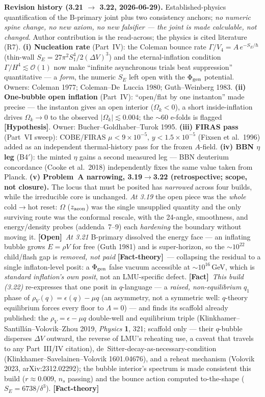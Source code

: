 \documentclass[11pt]{article}
\newcommand{\fact}{\textcolor{green!40!black}{\textbf{[Fact]}}}
\newcommand{\factth}{\textcolor{green!40!black}{\textbf{[Fact-theory]}}}
\newcommand{\hyp}{\textcolor{orange!80!black}{\textbf{[Hypothesis]}}}
\newcommand{\open}{\textcolor{red!70!black}{\textbf{[Open]}}}
\begin{document}
{\smallskip\noindent\textbf{Revision history (3.21 $\to$ 3.22, 2026-06-29).} Established-physics quantification of the B-primary joint plus two consistency anchors; \emph{no numeric spine change, no new axiom, no new falsifier --- the joint is made calculable, not changed}. Author contribution is the read-across; the physics is cited literature (R7). \textbf{(i) Nucleation rate} (Part~IV): the Coleman bounce rate $\Gamma/V_4=A\,e^{-S_E/\hbar}$ (thin-wall $S_E=27\pi^2 S_1^4/2(\Delta V)^3$) and the eternal-inflation condition $\Gamma/H^4\lesssim\mathcal{O}(1)$ now make ``infinite asynchronous trials beat suppression'' quantitative --- a \emph{form}, the numeric $S_E$ left open with the $\Phi_{\rm gen}$ potential. Owners: Coleman 1977; Coleman--De~Luccia 1980; Guth--Weinberg 1983. \textbf{(ii) One-bubble open inflation} (Part~IV): ``open/flat by one instanton'' made precise --- the instanton gives an open interior ($\Omega_k<0$), a short inside-inflation drives $\Omega_k\to0$ to the observed $|\Omega_k|\lesssim0.004$; the $\sim$60 e-folds is flagged \hyp. Owner: Bucher--Goldhaber--Turok 1995. \textbf{(iii) FIRAS pass} (Part~VI sweep): COBE/FIRAS $\mu<9\times10^{-5}$, $y<1.5\times10^{-5}$ (Fixsen et al.\ 1996) added as an independent thermal-history pass for the frozen $A$-field. \textbf{(iv) BBN $\eta$ leg} (B4$'$): the minted $\eta$ gains a second measured leg --- BBN deuterium concordance (Cooke et al.\ 2018) independently fixes the same value taken from Planck. \textbf{(v) Problem~A narrowing, 3.19$\to$3.22 (retrospective; scope, not closure).} The locus that must be posited has \emph{narrowed} across four builds, while the irreducible core is unchanged. \emph{At 3.19} the open piece was the \emph{whole} cold$\to$hot reset: $\Omega$ ($z_{\rm aeon}$) was the single unsupplied quantity and the only surviving route was the conformal rescale, with the 24-angle, smoothness, and energy/density probes (addenda~7--9) each \emph{hardening} the boundary without moving it. \open\ \emph{At 3.21} B-primary dissolved the energy face --- an inflating bubble grows $E=\rho V$ for free (Guth 1981) and is super-horizon, so the $\sim\!10^{22}$ child/flash gap is \emph{removed, not paid} \factth\ --- collapsing the residual to a single inflaton-level posit: a $\Phi_{\rm gen}$ false vacuum accessible at $\sim\!10^{16}$\,GeV, which is \emph{standard inflation's own posit}, not an LMU-specific defect. \fact\ \emph{This build (3.22)} re-expresses that one posit in $q$-language --- a \emph{raised, non-equilibrium} $q_1$ phase of $\rho_V(q)=\epsilon(q)-\mu q$ (an asymmetry, not a symmetric well: $q$-theory equilibrium forces every floor to $\Lambda=0$) --- and finds its scaffold already published: the $\rho_V=\epsilon-\mu q$ double-well and equilibrium triple (Klinkhamer--Santill\'an--Volovik--Zhou 2019, \emph{Physics} \textbf{1}, 321; scaffold only --- their $q$-bubble disperses $\Delta V$ outward, the reverse of LMU's reheating use, a caveat that travels to any Part~III/IV citation), de~Sitter-decay-as-necessary-condition (Klinkhamer--Savelainen--Volovik 1601.04676), and a reheat mechanism (Volovik 2023, arXiv:2312.02292); the bubble interior's spectrum is made consistent this build ($r\approx0.009$, $n_s$ passing) and the bounce action computed to-the-shape ($S_E=6738/\delta^3$). \factth\ }
\end{document}
